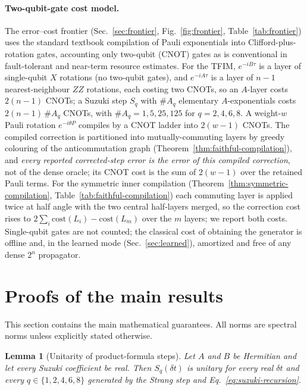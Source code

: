 \documentclass[aps,prresearch,reprint,superscriptaddress,nofootinbib,amsmath,amssymb]{revtex4-2}
\newcommand{\tfim}{TFIM}
\newcommand{\dt}{\delta t}
\newtheorem{lemma}{Lemma}
\begin{document}
\paragraph{Two-qubit-gate cost model.} The error--cost frontier (Sec.~\ref{sec:frontier}, Fig.~\ref{fig:frontier}, Table~\ref{tab:frontier}) uses the standard textbook compilation of Pauli exponentials into Clifford-plus-rotation gates, accounting only two-qubit (CNOT) gates as is conventional in fault-tolerant and near-term resource estimates. For the \tfim{}, $e^{-iB\tau}$ is a layer of single-qubit $X$ rotations (no two-qubit gates), and $e^{-iA\tau}$ is a layer of $n-1$ nearest-neighbour $ZZ$ rotations, each costing two CNOTs, so an $A$-layer costs $2(n-1)$ CNOTs; a Suzuki step $S_q$ with $\#A_q$ elementary $A$-exponentials costs $2(n-1)\,\#A_q$ CNOTs, with $\#A_q=1,5,25,125$ for $q=2,4,6,8$. A weight-$w$ Pauli rotation $e^{-i\theta P}$ compiles by a CNOT ladder into $2(w-1)$ CNOTs. The compiled correction is partitioned into mutually-commuting layers by greedy colouring of the anticommutation graph (Theorem~\ref{thm:faithful-compilation}), and \emph{every reported corrected-step error is the error of this compiled correction}, not of the dense oracle; its CNOT cost is the sum of $2(w-1)$ over the retained Pauli terms. For the symmetric inner compilation (Theorem~\ref{thm:symmetric-compilation}, Table~\ref{tab:faithful-compilation}) each commuting layer is applied twice at half angle with the two central half-layers merged, so the correction cost rises to $2\sum_i\mathrm{cost}(L_i)-\mathrm{cost}(L_m)$ over the $m$ layers; we report both costs. Single-qubit gates are not counted; the classical cost of obtaining the generator is offline and, in the learned mode (Sec.~\ref{sec:learned}), amortized and free of any dense $2^n$ propagator.

\section{Proofs of the main results}
\label{app:proofs}

This section contains the main mathematical guarantees. All norms are spectral norms unless explicitly stated otherwise.

\begin{lemma}[Unitarity of product-formula steps]
\label{lem:Sq-unitary}
Let $A$ and $B$ be Hermitian and let every Suzuki coefficient be real. Then $S_q(\dt)$ is unitary for every real $\dt$ and every $q\in\{1,2,4,6,8\}$ generated by the Strang step and Eq.~\eqref{eq:suzuki-recursion}.
\end{lemma}
\end{document}
